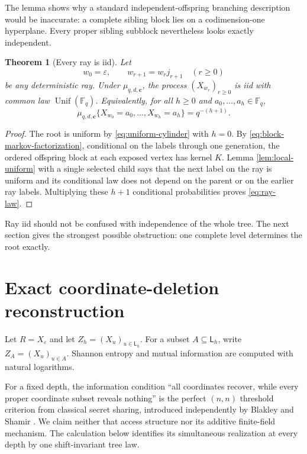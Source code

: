 \documentclass[11pt,a4paper]{amsart}
\newtheorem{theorem}{Theorem}[section]
\theoremstyle{definition}
\theoremstyle{remark}
\newcommand{\F}{\mathbb F}
\newcommand{\eps}{\varepsilon}
\newcommand{\Lev}{\mathsf L}
\newcommand{\Unif}{\operatorname{Unif}}
\begin{document}
The lemma shows why a standard independent-offspring branching description
would be inaccurate: a complete sibling block lies on a codimension-one
hyperplane.  Every proper sibling subblock nevertheless looks exactly
independent.

\begin{theorem}[Every ray is iid]\label{thm:ray}
Let
\[
 w_0=\eps,
 \qquad w_{r+1}=w_rj_{r+1}
 \quad(r\geq0)
\]
be any deterministic ray.  Under $\mu_{q,d,\boldsymbol c}$, the process
$(X_{w_r})_{r\geq0}$ is iid with common law $\Unif(\F_q)$.  Equivalently,
for all $h\geq0$ and $a_0,\ldots,a_h\in\F_q$,
\begin{equation}\label{eq:ray-law}
 \mu_{q,d,\boldsymbol c}
 \{X_{w_0}=a_0,\ldots,X_{w_h}=a_h\}=q^{-(h+1)}.
\end{equation}
\end{theorem}

\begin{proof}
The root is uniform by \eqref{eq:uniform-cylinder} with $h=0$.  By
\eqref{eq:block-markov-factorization}, conditional on the labels through one
generation, the ordered offspring block at each exposed vertex has kernel
$K$.  Lemma \ref{lem:local-uniform} with a single selected child says that
the next label on the ray is uniform and its conditional law does not depend
on the parent or on the earlier ray labels.  Multiplying these $h+1$
conditional probabilities proves \eqref{eq:ray-law}.
\end{proof}

Ray iid should not be confused with independence of the whole tree.  The
next section gives the strongest possible obstruction: one complete level
determines the root exactly.

\section{Exact coordinate-deletion reconstruction}
\label{sec:reconstruction}

Let $R=X_\eps$ and let $Z_h=(X_u)_{u\in\Lev_h}$.  For a subset
$A\subseteq\Lev_h$, write $Z_A=(X_u)_{u\in A}$.  Shannon entropy and mutual
information are computed with natural logarithms.

For a fixed depth, the information condition ``all coordinates recover,
while every proper coordinate subset reveals nothing'' is the perfect
$(n,n)$ threshold criterion from classical secret sharing, introduced
independently by Blakley and Shamir \cite{Blakley1979,Shamir1979}.  We claim
neither that access structure nor its additive finite-field mechanism.  The
calculation below identifies its simultaneous realization at every depth by
one shift-invariant tree law.
\end{document}
